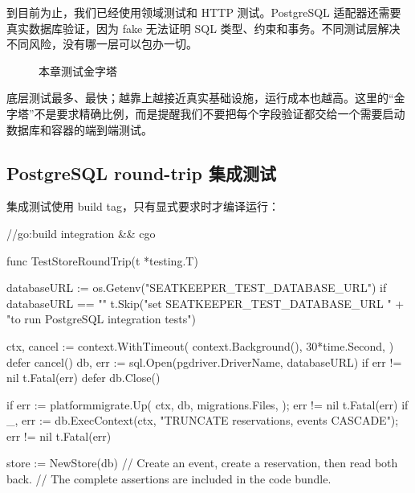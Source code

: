 到目前为止，我们已经使用领域测试和 HTTP 测试。PostgreSQL 适配器还需要真实数据库验证，因为 fake 无法证明 SQL 类型、约束和事务。不同测试层解决不同风险，没有哪一层可以包办一切。

\begin{figure}[tbp]
\centering
{}
\caption{本章测试金字塔}
\label{fig:seatkeeper-test-pyramid}
\end{figure}

底层测试最多、最快；越靠上越接近真实基础设施，运行成本也越高。这里的“金字塔”不是要求精确比例，而是提醒我们不要把每个字段验证都交给一个需要启动数据库和容器的端到端测试。

\subsection{PostgreSQL round-trip 集成测试}

集成测试使用 build tag，只有显式要求时才编译运行：

\begin{gocode}[title={代码清单 12.48 \texttt{store\_integration\_test.go}：真实数据库往返}]
//go:build integration && cgo

func TestStoreRoundTrip(t *testing.T) {
    databaseURL := os.Getenv("SEATKEEPER_TEST_DATABASE_URL")
    if databaseURL == "" {
        t.Skip("set SEATKEEPER_TEST_DATABASE_URL " +
            "to run PostgreSQL integration tests")
    }

    ctx, cancel := context.WithTimeout(
        context.Background(), 30*time.Second,
    )
    defer cancel()
    db, err := sql.Open(pgdriver.DriverName, databaseURL)
    if err != nil {
        t.Fatal(err)
    }
    defer db.Close()

    if err := platformmigrate.Up(
        ctx, db, migrations.Files,
    ); err != nil {
        t.Fatal(err)
    }
    if _, err := db.ExecContext(ctx,
        "TRUNCATE reservations, events CASCADE"); err != nil {
        t.Fatal(err)
    }

    store := NewStore(db)
    // Create an event, create a reservation, then read both back.
    // The complete assertions are included in the code bundle.
}
\end{gocode}


